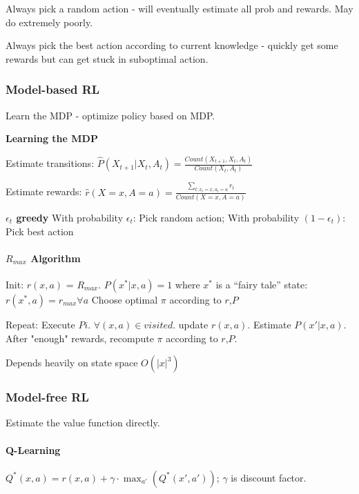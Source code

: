 \documentclass[a4paper, 10pt]{scrartcl}
\begin{document}
\begin{multicols*}{3}
\begin{compactitem}
	\item Always pick a random action - will eventually estimate all prob and rewards. May do extremely poorly. 
	\item Always pick the best action according to current knowledge - quickly get some rewards but can get stuck in suboptimal action.
\end{compactitem}

\subsubsection{Model-based RL }
Learn the MDP - optimize policy based on MDP.

\textbf{Learning the MDP}

Estimate transitions: $\hat{P}(X_{t+1} | X_t, A_t) = \frac{Count(X_{t+1}, X_t, A_t)}{Count(X_t, A_t)}$

Estimate rewards: $\hat{r}(X=x, A= a) = \frac{\sum_{t: x_t = x, a_t = a} r_t}{Count(X = x, A = a)}$

\textbf{ $\epsilon_t$ greedy}
With probability  $\epsilon_t$: Pick random action; With probability $(1- \epsilon_t)$: Pick best action

\paragraph{$R_{max}$ Algorithm}
Init: $r(x, a)$ = $R_{max}$.
$P(x^* | x, a) = 1$ where $x^*$ is a “fairy tale” state: $r(x^*, a) = r_{max}  \forall a$
Choose optimal $\pi$ according to $r$,$P$

Repeat:
Execute $Pi$. $\forall(x,a)\in visited$. update $r(x,a)$. Estimate $P(x'|x,a)$.
After "enough" rewards, recompute $\pi$ according to $r$,$P$.

Depends heavily on state space $O(|x|^3)$


\subsubsection{Model-free RL}
Estimate the value function directly.

\paragraph{Q-Learning}
$Q^*(x, a) = r(x, a) + \gamma \cdot \max_{a'} (Q^*(x', a'))$; $\gamma$ is discount factor.


\end{multicols*}
\end{document}
